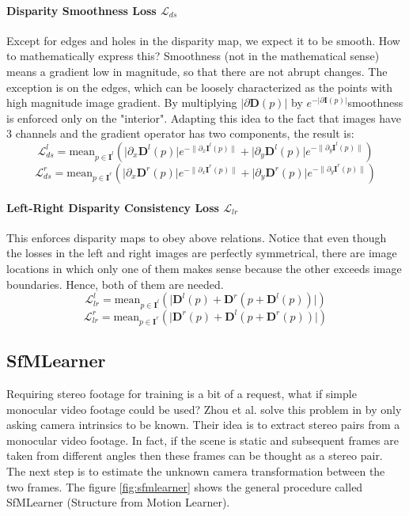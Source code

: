 \paragraph{Disparity Smoothness Loss $\mathcal{L}_{ds}$} Except for edges and holes in the disparity map, we expect it to be smooth.
How to mathematically express this?
Smoothness (not in the mathematical sense) means a gradient low in magnitude, so that there are not abrupt changes.
The exception is on the edges, which can be loosely characterized as the points with high magnitude image gradient.
By multiplying $\big| \partial \mathbf{D}(p) \big|$ by $e^{- \big| \partial \mathbf{I}(p) \big| }$smoothness is enforced only on the "interior".
Adapting this idea to the fact that images have 3 channels and the gradient operator has two components, the result is:
\[
	\mathcal{L}_{ds}^{l} = \text{mean}_{p \in \mathbf{I}^{l}}
		\left(
			\big| \partial_{x} \mathbf{D}^{l}(p) \big| e^{-\big\| \partial_{x} \mathbf{I}^{l}(p) \big\| } + 
			\big| \partial_{y} \mathbf{D}^{l}(p) \big| e^{-\big\| \partial_{y} \mathbf{I}^{l}(p) \big\| }
		\right)
\]\[
	\mathcal{L}_{ds}^{r} = \text{mean}_{p \in \mathbf{I}^{r}}
		\left(
			\big| \partial_{x} \mathbf{D}^{r}(p) \big| e^{-\big\| \partial_{x} \mathbf{I}^{r}(p) \big\| } + 
			\big| \partial_{y} \mathbf{D}^{r}(p) \big| e^{-\big\| \partial_{y} \mathbf{I}^{r}(p) \big\| }
		\right)
\]

\paragraph{Left-Right Disparity Consistency Loss $\mathcal{L}_{lr}$} This enforces disparity maps to obey above relations.
Notice that even though the losses in the left and right images are perfectly symmetrical, there are image locations in which only one of them makes sense because the other exceeds image boundaries.
Hence, both of them are needed.
\[
	\mathcal{L}_{lr}^{l} = \text{mean}_{p \in \mathbf{I}^{l}}
		\left(
			\big| \mathbf{D}^{l}(p) + \mathbf{D}^{r}(p + \mathbf{D}^{l}(p)) \big|
		\right)
\]\[
	\mathcal{L}_{lr}^{r} = \text{mean}_{p \in \mathbf{I}^{r}}
		\left(
			\big| \mathbf{D}^{r}(p) + \mathbf{D}^{l}(p + \mathbf{D}^{r}(p)) \big|
		\right)
\]

\subsection{SfMLearner}
Requiring stereo footage for training is a bit of a request, what if simple monocular video footage could be used?
Zhou et al. solve this problem in \cite{SfMLearner} by only asking camera intrinsics to be known.
Their idea is to extract stereo pairs from a monocular video footage.
In fact, if the scene is static and subsequent frames are taken from different angles then these frames can be thought as a stereo pair.
The next step is to estimate the unknown camera transformation between the two frames.
The figure \ref{fig:sfmlearner} shows the general procedure called SfMLearner (Structure from Motion Learner).

